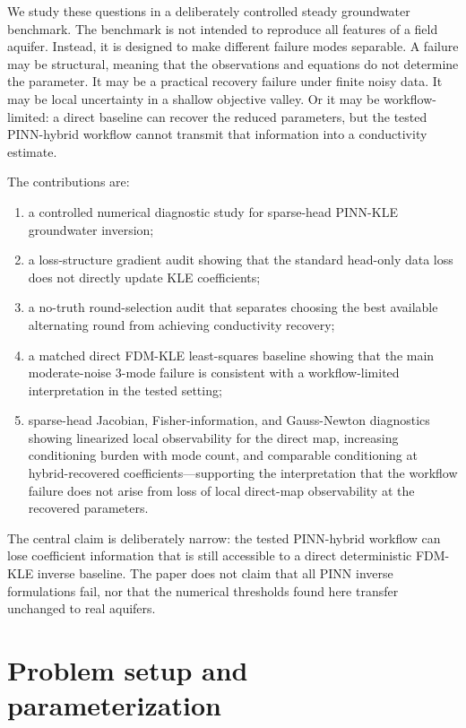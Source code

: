 \documentclass[pdflatex,sn-mathphys,Numbered,iicol]{sn-jnl}
\begin{document}
We study these questions in a deliberately controlled steady groundwater
benchmark. The benchmark is not intended to reproduce all features of a field
aquifer. Instead, it is designed to make different failure modes separable. A
failure may be structural, meaning that the observations and equations do not
determine the parameter. It may be a practical recovery failure under finite
noisy data. It may be local uncertainty in a shallow objective valley. Or it
may be workflow-limited: a direct baseline can recover the reduced parameters,
but the tested PINN-hybrid workflow cannot transmit that information into a
conductivity estimate.

The contributions are:
\begin{enumerate}
\item a controlled numerical diagnostic study for sparse-head PINN-KLE
  groundwater inversion;
\item a loss-structure gradient audit showing that the standard head-only data
  loss does not directly update KLE coefficients;
\item a no-truth round-selection audit that separates choosing the best
  available alternating round from achieving conductivity recovery;
\item a matched direct FDM-KLE least-squares baseline showing that the main
  moderate-noise 3-mode failure is consistent with a workflow-limited
  interpretation in the tested setting;
\item sparse-head Jacobian, Fisher-information, and Gauss-Newton diagnostics
  showing linearized local observability for the direct map, increasing
  conditioning burden with mode count, and comparable conditioning at
  hybrid-recovered coefficients---supporting the interpretation that the workflow failure does not
  arise from loss of local direct-map observability at the recovered parameters.
\end{enumerate}

The central claim is deliberately narrow: the tested PINN-hybrid workflow can
lose coefficient information that is still accessible to a direct deterministic
FDM-KLE inverse baseline. The paper does not claim that all PINN inverse
formulations fail, nor that the numerical thresholds found here transfer
unchanged to real aquifers.

\section{Problem setup and parameterization}
\label{sec:setup}
\end{document}
